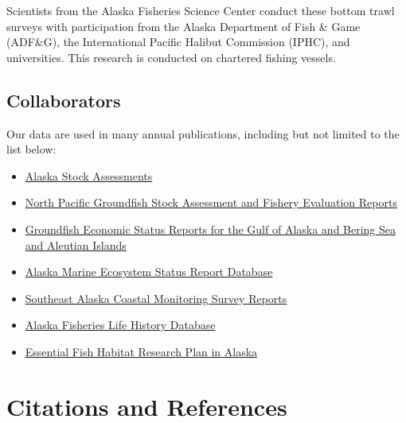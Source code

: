 \documentclass[
  letterpaper,
  oneside,
  open=any]{scrbook}
\providecommand{\tightlist}{%
  \setlength{\itemsep}{0pt}\setlength{\parskip}{0pt}}\usepackage{longtable,booktabs,array}
\begin{document}
Scientists from the Alaska Fisheries Science Center conduct these bottom
trawl surveys with participation from the Alaska Department of Fish \&
Game (ADF\&G), the International Pacific Halibut Commission (IPHC), and
universities. This research is conducted on chartered fishing vessels.

\hypertarget{collaborators}{%
\section{Collaborators}\label{collaborators}}

Our data are used in many annual publications, including but not limited
to the list below:

\begin{itemize}
\tightlist
\item
  \href{https://www.fisheries.noaa.gov/alaska/population-assessments/alaska-stock-assessments}{Alaska
  Stock Assessments}
\item
  \href{https://www.fisheries.noaa.gov/alaska/population-assessments/north-pacific-groundfish-stock-assessment-and-fishery-evaluation}{North
  Pacific Groundfish Stock Assessment and Fishery Evaluation Reports}
\item
  \href{https://www.fisheries.noaa.gov/alaska/commercial-fishing/groundfish-economic-status-reports-gulf-alaska-and-bering-sea-and-aleutian-islands}{Groundfish
  Economic Status Reports for the Gulf of Alaska and Bering Sea and
  Aleutian Islands}
\item
  \href{https://www.fisheries.noaa.gov/resource/data/alaska-marine-ecosystem-status-report-archive}{Alaska
  Marine Ecosystem Status Report Database}
\item
  \href{https://www.fisheries.noaa.gov/alaska/commercial-fishing/southeast-alaska-coastal-monitoring-survey-reports}{Southeast
  Alaska Coastal Monitoring Survey Reports}
\item
  \href{https://www.fisheries.noaa.gov/resource/data/alaska-fisheries-life-history-database}{Alaska
  Fisheries Life History Database}
\item
  \href{https://www.fisheries.noaa.gov/alaska/habitat-conservation/essential-fish-habitat-research-plan-alaska}{Essential
  Fish Habitat Research Plan in Alaska}
\end{itemize}

\hypertarget{citations-and-references}{%
\chapter{Citations and References}\label{citations-and-references}}
\end{document}
